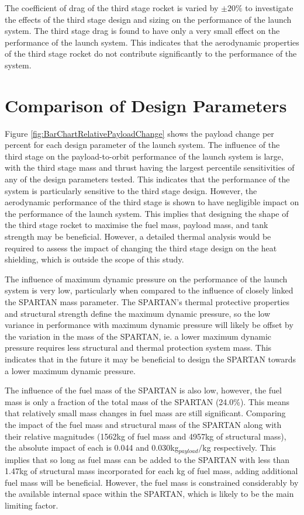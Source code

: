 The coefficient of drag of the third stage rocket is varied by $\pm20\%$ to investigate the effects of the third stage design and sizing on the performance of the launch system. The third stage drag is found to have only a very small effect on the performance of the launch system. This indicates that the aerodynamic properties of the third stage rocket do not contribute significantly to the performance of the system. 


\section{Comparison of Design Parameters}

Figure \ref{fig:BarChartRelativePayloadChange} shows the payload change per percent for each design parameter of the launch system. 
The influence of the third stage on the payload-to-orbit performance of the launch system is large, with the third stage mass and thrust having the largest percentile sensitivities of any of the design parameters tested. This indicates that the performance of the system is particularly sensitive to the third stage design. However, the aerodynamic performance of the third stage is shown to have negligible impact on the performance of the launch system. This implies that designing the shape of the third stage rocket to maximise the fuel mass, payload mass, and tank strength may be beneficial. However, a detailed thermal analysis would be required to assess the impact of changing the third stage design on the heat shielding, which is outside the scope of this study.  


The influence of maximum dynamic pressure on the performance of the launch system is very low, particularly when compared to the influence of closely linked the SPARTAN mass parameter. The SPARTAN's thermal protective properties and structural strength define the maximum dynamic pressure, so the low variance in performance with maximum dynamic pressure will likely be offset by the variation in the mass of the SPARTAN, ie. a lower maximum dynamic pressure requires less structural and thermal protection system mass. This indicates that in the future it may be beneficial to design the SPARTAN towards a lower maximum dynamic pressure.

The influence of the fuel mass of the SPARTAN is also low, however, the fuel mass is only a fraction of the total mass of the SPARTAN (24.0\%). This means that relatively small mass changes in fuel mass are still significant. Comparing the impact of the fuel mass and structural mass of the SPARTAN along with their relative magnitudes (1562kg of fuel mass and 4957kg of structural mass), the absolute impact of each is 0.044 and 0.030kg$_{payload}/$kg respectively. This implies that so long as fuel mass can be added to the SPARTAN with less than 1.47kg of structural mass incorporated for each kg of fuel mass, adding additional fuel mass will be beneficial. However, the fuel mass is constrained considerably by the available internal space within the SPARTAN, which is likely to be the main limiting factor.



